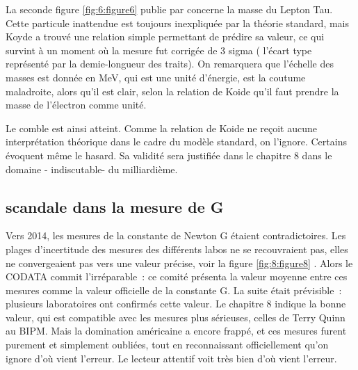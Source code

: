 \documentclass[a4paper,12pt]{article}
\begin{document}
La seconde figure \ref{fig:6:figure6} publie par \cite{Tanabashi} concerne la masse du Lepton Tau. Cette particule inattendue est toujours inexpliquée par la théorie standard, mais Koyde a trouvé une relation simple permettant de prédire sa valeur, ce qui survint à un moment où la mesure fut corrigée de 3 sigma ( l’écart type représenté par la demie-longueur des traits). On remarquera que l’échelle des masses est donnée en MeV, qui est une unité d’énergie, est la coutume maladroite, alors qu’il est clair, selon la relation de Koide qu’il faut prendre la masse de l’électron comme unité. 

Le comble est ainsi atteint. Comme la relation de Koide ne reçoit aucune interprétation théorique dans le cadre du modèle standard, on l’ignore. Certains évoquent même le hasard. Sa validité sera justifiée dans le chapitre 8 dans le domaine - indiscutable- du milliardième. 



\subsection {scandale dans la mesure de G}
Vers 2014, les mesures de la constante de Newton G étaient contradictoires. Les plages d’incertitude des mesures des différents labos ne se recouvraient pas, elles ne convergeaient pas vers une valeur précise, voir la figure \ref{fig:8:figure8} \cite{Wu}.
 Alors le CODATA commit l’irréparable : ce comité présenta la valeur moyenne entre ces mesures comme la valeur officielle de la constante G.
La suite était prévisible : plusieurs laboratoires ont confirmés cette valeur. Le chapitre 8 indique la bonne valeur, qui est compatible avec les mesures plus sérieuses, celles de Terry Quinn au BIPM. Mais la domination américaine a encore frappé, et ces mesures furent purement et simplement oubliées, tout en reconnaissant officiellement qu’on ignore d’où vient l’erreur.
Le lecteur attentif voit très bien d’où vient l’erreur. 
\end{document}
